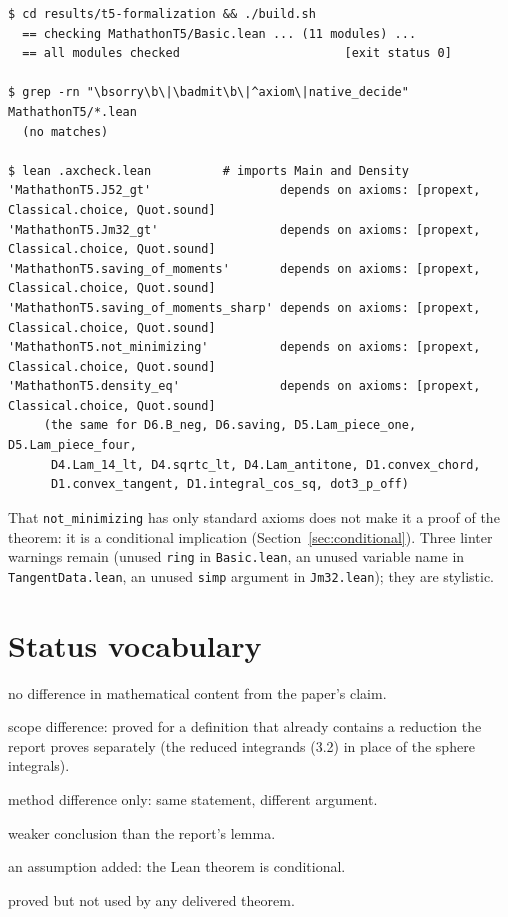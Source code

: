 \documentclass[11pt]{article}
\newcommand{\Ln}[1]{\texttt{#1}}
\newcommand{\No}{\texttt{(N)}}
\newcommand{\Sc}{\texttt{(S)}}
\newcommand{\Me}{\texttt{(M)}}
\newcommand{\Wk}{\texttt{(W)}}
\newcommand{\As}{\texttt{(A)}}
\newcommand{\Us}{\texttt{(U)}}
\begin{document}
\begin{verbatim}
$ cd results/t5-formalization && ./build.sh
  == checking MathathonT5/Basic.lean ... (11 modules) ...
  == all modules checked                       [exit status 0]

$ grep -rn "\bsorry\b\|\badmit\b\|^axiom\|native_decide" MathathonT5/*.lean
  (no matches)

$ lean .axcheck.lean          # imports Main and Density
'MathathonT5.J52_gt'                  depends on axioms: [propext, Classical.choice, Quot.sound]
'MathathonT5.Jm32_gt'                 depends on axioms: [propext, Classical.choice, Quot.sound]
'MathathonT5.saving_of_moments'       depends on axioms: [propext, Classical.choice, Quot.sound]
'MathathonT5.saving_of_moments_sharp' depends on axioms: [propext, Classical.choice, Quot.sound]
'MathathonT5.not_minimizing'          depends on axioms: [propext, Classical.choice, Quot.sound]
'MathathonT5.density_eq'              depends on axioms: [propext, Classical.choice, Quot.sound]
     (the same for D6.B_neg, D6.saving, D5.Lam_piece_one, D5.Lam_piece_four,
      D4.Lam_14_lt, D4.sqrtc_lt, D4.Lam_antitone, D1.convex_chord,
      D1.convex_tangent, D1.integral_cos_sq, dot3_p_off)
\end{verbatim}

That \Ln{not\_\allowbreak{}minimizing} has only standard axioms does not make it a proof of the theorem: it is
a conditional implication (Section~\ref{sec:conditional}). Three linter warnings remain (unused
\Ln{ring} in \Ln{Basic.lean}, an unused variable name in \Ln{TangentData.lean}, an unused
\Ln{simp} argument in \Ln{Jm32.lean}); they are stylistic.

\section{Status vocabulary}

\begin{description}\itemsep2pt
\item[\No] no difference in mathematical content from the paper's claim.
\item[\Sc] scope difference: proved for a definition that already contains a reduction the
report proves separately (the reduced integrands (3.2) in place of the sphere integrals).
\item[\Me] method difference only: same statement, different argument.
\item[\Wk] weaker conclusion than the report's lemma.
\item[\As] an assumption added: the Lean theorem is conditional.
\item[\Us] proved but not used by any delivered theorem.
\end{description}
\end{document}
